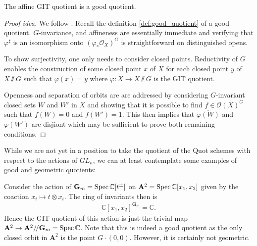 \documentclass[12pt]{ociamthesis}  %
\begin{document}
\begin{theorem}\label{thm:affine_quotient_is_good}
  The affine GIT quotient is a good quotient.
  \begin{proof}[Proof idea]
    We follow \cite[Theorem 4.30]{hoskins2016}. Recall the definition
    \ref{def:good_quotient} of a good quotient. $G$-invariance,
    and affineness are essentially immediate and verifying that
    $\varphi^\sharp$ is an isomorphism onto $(\varphi_*\mathscr O_X)^G$
    is straightforward on distinguished opens.

    To show surjectivity, one only needs to consider closed points.
    Reductivity of $G$ enables the construction of some closed point
    $x$ of $X$ for each closed point $y$ of $X\sslash G$ such that
    $\varphi(x) = y$ where $\varphi : X\to X\sslash G$ is the GIT quotient.

    Openness and separation of orbits are are addressed by considering
    $G$-invariant closed sets $W$ and $W'$ in $X$ and showing that
    it is possible to find $f\in\mathscr O(X)^G$ such that
    $f(W) = 0$ and $f(W') = 1$. \cite[Lemma 4.29]{hoskins2016}
    This then implies that $\overline{\varphi(W)}$ and $\overline{\varphi(W')}$
    are disjiont which may be sufficient to prove both remaining conditions.
  \end{proof}
\end{theorem}

While we are not yet in a position to take the quotient of the Quot
schemes with respect to the actions of $GL_n$,
we can at least contemplate some examples of good and geometric
quotients:

\begin{example}
  Consider the action of $\mathbf G_m = \operatorname{Spec}\mathbb C[t^\pm]$ on
  $\mathbf A^2 = \operatorname{Spec}\mathbb C[x_1, x_2]$ given by
  the coaction $x_i \mapsto t\otimes x_i$. The ring of
  invariants then is
  \begin{align*}
    \mathbb C[x_1,x_2]^{\mathbf G_m} = \mathbb C.
  \end{align*}
  Hence the GIT quotient of this action is just the
  trivial map $\mathbf A^2 \to \mathbf A^2 /\!/ \mathbf G_m = \operatorname{Spec}\mathbb C$. Note that this
  is indeed a good quotient as the only closed orbit in $\mathbf A^2$ is
  the point $G\cdot(0,0)$. However, it is certainly not geometric.
\end{example}
\end{document}
